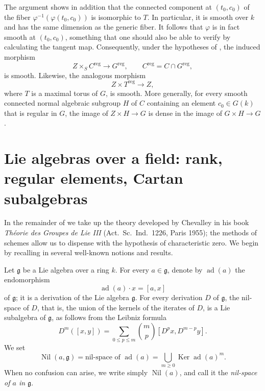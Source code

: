 \begin{remarks}
The argument shows in addition that the connected component at
\((t_0,c_0)\) of the fiber
\(\varphi^{-1}(\varphi(t_0,c_0))\) is isomorphic to \(T\). In
particular, it is smooth over \(k\) and has the same dimension as the
generic fiber. It follows that \(\varphi\) is in fact smooth at
\((t_0,c_0)\), something that one should also be able to verify by
calculating the tangent map. Consequently, under the hypotheses of
, the induced morphism
\[
  Z\times_S C^{\mathrm{reg}}\longrightarrow G^{\mathrm{reg}},
  \qquad C^{\mathrm{reg}}=C\cap G^{\mathrm{reg}},
\]
is smooth. Likewise, the analogous morphism
\[
  Z\times T^{\mathrm{reg}}\longrightarrow Z,
\]
where \(T\) is a maximal torus of \(G\), is smooth. More generally,
for every smooth connected normal algebraic subgroup \(H\) of \(C\)
containing an element \(c_0\in G(k)\) that is regular in \(G\), the
image of \(Z\times H\to G\) is dense in the image of
\(G\times H\to G\).
\end{remarks}

\section{Lie algebras over a field: rank, regular elements, Cartan subalgebras}

In the remainder of  we take up the theory developed by
Chevalley in his book \emph{Théorie des Groupes de Lie III}
(Act.\ Sc.\ Ind.\ 1226, Paris 1955); the methods of schemes allow us
to dispense with the hypothesis of characteristic zero. We begin by
recalling in  several well-known notions and results.

Let \(\mathfrak g\) be a Lie algebra over a ring \(k\). For every
\(a\in\mathfrak g\), denote by \(\operatorname{ad}(a)\) the
endomorphism
\[
  \operatorname{ad}(a)\cdot x=[a,x]
\]
of \(\mathfrak g\); it is a derivation of the Lie algebra
\(\mathfrak g\). For every derivation \(D\) of \(\mathfrak g\), the
nil-space of \(D\), that is, the union of the kernels of the iterates
of \(D\), is a Lie subalgebra of \(\mathfrak g\), as follows from the
Leibniz formula
\[
  D^m([x,y])
  =
  \sum_{0\leq p\leq m}
  \binom{m}{p}[D^p x,D^{m-p}y].
\]
We set
\[
  \operatorname{Nil}(a,\mathfrak g)
  =
  \text{nil-space of }\operatorname{ad}(a)
  =
  \bigcup_{m\geq0}\operatorname{Ker}\operatorname{ad}(a)^m.
\]
When no confusion can arise, we write simply
\(\operatorname{Nil}(a)\), and call it the \emph{nil-space of \(a\)
in \(\mathfrak g\)}.

